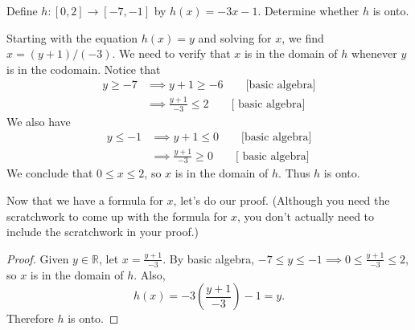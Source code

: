 \begin{example}{}
Define $h \colon [0,2] \to [-7,-1]$ by $h(x) = -3x - 1$. Determine whether $h$ is onto.

\begin{scratchwork} Starting with the equation $h(x) = y$ and solving for $x$, we find 
$x = (y+1)/(-3).$ We need to verify that $x$ is in the domain of $h$ whenever $y$ is in the codomain.  Notice that
\begin{align*}
y \ge -7  &\implies y+1 \ge -6 \qquad \text{[basic algebra]}\\
 & \implies \frac{y+1}{-3} \le 2 \qquad \text{[ basic algebra]}
\end{align*} 
We also have
\begin{align*}
y \le -1  &\implies y+1 \le 0 \qquad \text{[basic algebra]}\\
 & \implies \frac{y+1}{-3} \ge 0 \qquad \text{[ basic algebra]}
\end{align*} 
We conclude that $0 \le  x \le 2$, so $x$ is in the domain of $h$. Thus $h$ is onto.
\end{scratchwork}

\noindent
Now that we have a formula for $x$, let's do our proof. (Although you need the scratchwork to come up with the formula for $x$, you don't actually need to include the scratchwork in your proof.)

\begin{proof} 
Given $y \in \mathbb{R}$, let $x = \frac{y+1}{-3}$. By  basic algebra, $-7 \le y \le -1 \implies 0 \le  \frac{y+1}{-3} \le 2$, so $x$ is in the domain of $h$. Also,
\[ h(x) = -3 \left(\frac{y+1}{-3} \right) - 1  = y . \]
Therefore $h$ is onto.
\end{proof}

\end{example}

